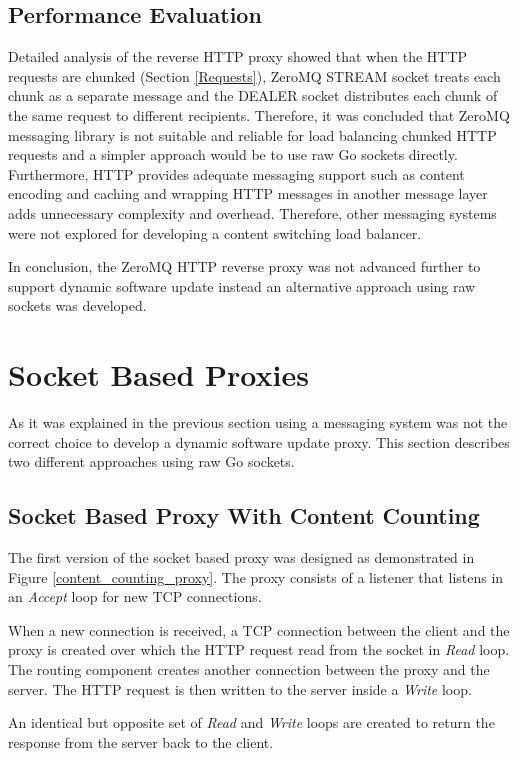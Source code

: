 \documentclass[a4paper,11pt,twoside]{report}
\begin{document}
\subsection{Performance Evaluation}
Detailed analysis of the reverse HTTP proxy showed that when the HTTP requests are chunked (Section \ref{Requests}), ZeroMQ STREAM socket treats each chunk as a separate message and the DEALER socket distributes each chunk of the same request to different recipients. Therefore, it was concluded that ZeroMQ messaging library is not suitable and reliable for load balancing chunked HTTP requests and a simpler approach would be to use raw Go sockets directly. Furthermore, HTTP provides adequate messaging support such as content encoding and caching and wrapping HTTP messages in another message layer adds unnecessary complexity and overhead. Therefore, other messaging systems were not explored for developing a content switching load balancer. 

In conclusion, the ZeroMQ HTTP reverse proxy was not advanced further to support dynamic software update instead an alternative approach using raw sockets was developed. 

\section{Socket Based Proxies}
As it was explained in the previous section using a messaging system was not the correct choice to develop a dynamic software update proxy. This section describes two different approaches using raw Go sockets.   

\subsection{Socket Based Proxy With Content Counting}\label{Content-Counting}
The first version of the socket based proxy was designed as demonstrated in Figure \ref{content_counting_proxy}. The proxy consists of a listener that listens in an  \textit{Accept} loop for new TCP connections. 

When a new connection is received, a TCP connection between the client and the proxy is created over which the HTTP request read from the socket in \textit{Read} loop.  The routing component creates another connection between the proxy and the server.  The HTTP request is then written to the server inside a \textit{Write} loop.

An identical but opposite set of \textit{Read} and \textit{Write} loops are created to return the response from the server back to the client.
\end{document}
